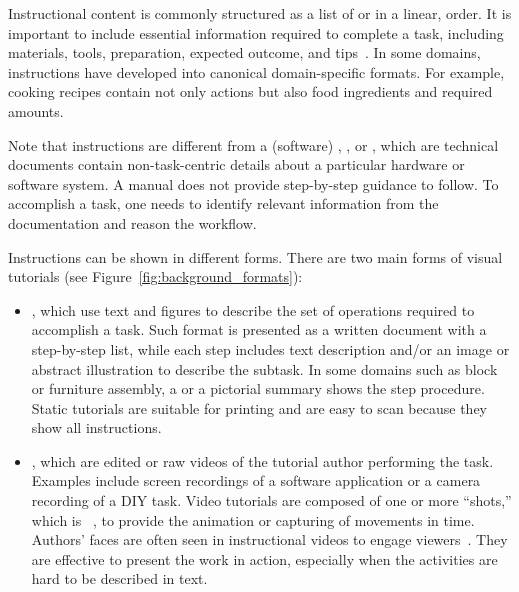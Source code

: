 Instructional content is commonly structured as a list of  or  in a linear,  order.
%
It is important to include essential information required to complete a task, including materials, tools, preparation, expected outcome, and tips~\cite{Torrey:2007he}.
%
In some domains, instructions have developed into canonical domain-specific formats. For example, cooking recipes contain not only actions but also food ingredients and required amounts.

Note that instructions are different from a (software) , , or , which are technical documents contain non-task-centric details about a particular hardware or software system. A manual does not provide step-by-step guidance to follow. To accomplish a task, one needs to identify relevant information from the documentation and reason the workflow.


Instructions can be shown in different forms. There are two main forms of visual tutorials (see Figure~\ref{fig:background_formats}):
\begin{itemize}
  \item {}, which use text and figures to describe the set of operations required to accomplish a task. Such format is presented as a written document with a step-by-step list, while each step includes text description and/or an image or abstract illustration to describe the subtask. In some domains such as block or furniture assembly, a  or a pictorial summary shows the step procedure. Static tutorials are suitable for printing and are easy to scan because they show all instructions.
  \item {}, which are edited or raw videos of the tutorial author performing the task. Examples include screen recordings of a software application or a camera recording of a DIY task.
  Video tutorials are composed of one or more ``shots,'' which is ~\cite{Goldman:2007:FVA:1354647}, to provide the animation or capturing of movements in time. Authors' faces are often seen in instructional videos to engage viewers~\cite{Kizilcec:2014:SFV:2556288.2557207}.
  They are effective to present the work in action, especially when the activities are hard to be described in text.
\end{itemize}

